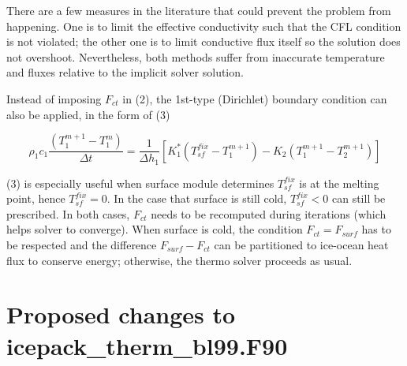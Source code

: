 \documentclass[10pt,letterpaper,oneside]{article}
\begin{document}
There are a few measures in the literature that could prevent the problem from happening. One is to limit the effective conductivity such that the CFL condition is not violated; the other one is to limit conductive flux itself so the solution does not overshoot. Nevertheless, both methods suffer from inaccurate temperature and fluxes relative to the implicit solver solution. 

Instead of imposing $F_{ct}$ in (2), the 1st-type (Dirichlet) boundary condition can also be applied, in the form of (3)

\begin{equation} 
\rho_{1}c_{1}\frac{\left( T^{m+1}_{1}-T^{m}_{1} \right)}{\Delta{t}}=\frac{1}{\Delta{h_{1}}} \left[ K^{*}_1  \left( T^{fix}_{sf}-T^{m+1}_{1} \right) - K_{2}  \left( T^{m+1}_{1}-T^{m+1}_{2} \right) \right] 
\end{equation}

(3) is especially useful when surface module determines $T^{fix}_{sf}$ is at the melting point,  hence $T^{fix}_{sf} = 0$. In the case that surface is still cold,  $T^{fix}_{sf} < 0$ can still be prescribed. In both cases, $F_{ct}$ needs to be recomputed during iterations (which helps solver to converge). When surface is cold, the condition $F_{ct} = F_{surf}$ has to be respected and the difference  $F_{surf} - F_{ct}$ can be partitioned to ice-ocean heat flux to conserve energy; otherwise, the thermo solver proceeds as usual. 
 
      



\section{Proposed changes to \textbf{icepack\_therm\_bl99.F90}}
\end{document}
